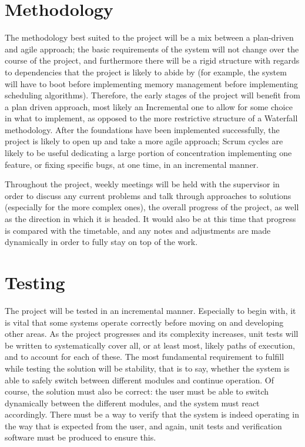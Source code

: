 \documentclass[10pt,a4paper]{article}
\begin{document}
\section{Methodology}
The methodology best suited to the project will be a mix between a plan-driven
and agile approach; the basic requirements of the system will not change over
the course of the project, and furthermore there will be a rigid structure with
regards to dependencies that the project is likely to abide by (for example, the
system will have to boot before implementing memory management before
implementing scheduling algorithms). Therefore, the early stages of the project
will benefit from a plan driven approach, most likely an Incremental one to
allow for some choice in what to implement, as opposed to the more restrictive
structure of a Waterfall methodology. After the foundations have been
implemented successfully, the project is likely to open up and take a more agile
approach; Scrum cycles are likely to be useful dedicating a large portion of
concentration implementing one feature, or fixing specific bugs, at one time, in
an incremental manner.

Throughout the project, weekly meetings will be held with the supervisor in
order to discuss any current problems and talk through approaches to solutions
(especially for the more complex ones), the overall progress of the project, as
well as the direction in which it is headed. It would also be at this time that
progress is compared with the timetable, and any notes and adjustments are made
dynamically in order to fully stay on top of the work.

\section{Testing}
The project will be tested in an incremental manner. Especially to begin with,
it is vital that some systems operate correctly before moving on and developing
other areas. As the project progresses and its complexity increases, unit tests
will be written to systematically cover all, or at least most, likely paths of
execution, and to account for each of these. The most fundamental requirement to
fulfill while testing the solution will be stability, that is to say, whether
the system is able to safely switch between different modules and continue
operation. Of course, the solution must also be correct: the user must be able
to switch dynamically between the different modules, and the system must react
accordingly. There must be a way to verify that the system is indeed operating
in the way that is expected from the user, and again, unit tests and
verification software must be produced to ensure this.
\end{document}
